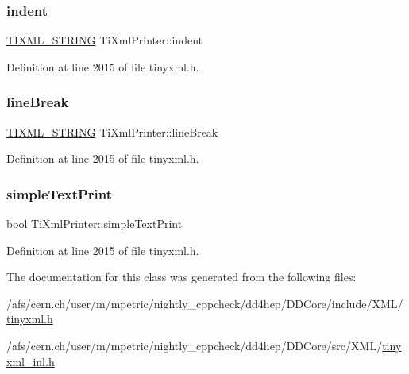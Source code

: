 \subsubsection{\texorpdfstring{indent}{indent}}
{\footnotesize\ttfamily \hyperlink{tinyxml_8h_a92bada05fd84d9a0c9a5bbe53de26887}{T\+I\+X\+M\+L\+\_\+\+S\+T\+R\+I\+NG} Ti\+Xml\+Printer\+::indent\hspace{0.3cm}{\ttfamily [private]}}



Definition at line 2015 of file tinyxml.\+h.

\hypertarget{class_ti_xml_printer_a25e8120bcfda10cc06a11b2dedcef7fe}{}\label{class_ti_xml_printer_a25e8120bcfda10cc06a11b2dedcef7fe} 
\subsubsection{\texorpdfstring{line\+Break}{lineBreak}}
{\footnotesize\ttfamily \hyperlink{tinyxml_8h_a92bada05fd84d9a0c9a5bbe53de26887}{T\+I\+X\+M\+L\+\_\+\+S\+T\+R\+I\+NG} Ti\+Xml\+Printer\+::line\+Break\hspace{0.3cm}{\ttfamily [private]}}



Definition at line 2015 of file tinyxml.\+h.

\hypertarget{class_ti_xml_printer_a2dceede5ae9bb8948f1ecaabb24ab2fb}{}\label{class_ti_xml_printer_a2dceede5ae9bb8948f1ecaabb24ab2fb} 
\subsubsection{\texorpdfstring{simple\+Text\+Print}{simpleTextPrint}}
{\footnotesize\ttfamily bool Ti\+Xml\+Printer\+::simple\+Text\+Print\hspace{0.3cm}{\ttfamily [private]}}



Definition at line 2015 of file tinyxml.\+h.



The documentation for this class was generated from the following files\+:\begin{DoxyCompactItemize}
\item 
/afs/cern.\+ch/user/m/mpetric/nightly\+\_\+cppcheck/dd4hep/\+D\+D\+Core/include/\+X\+M\+L/\hyperlink{tinyxml_8h}{tinyxml.\+h}\item 
/afs/cern.\+ch/user/m/mpetric/nightly\+\_\+cppcheck/dd4hep/\+D\+D\+Core/src/\+X\+M\+L/\hyperlink{tinyxml__inl_8h}{tinyxml\+\_\+inl.\+h}\end{DoxyCompactItemize}
